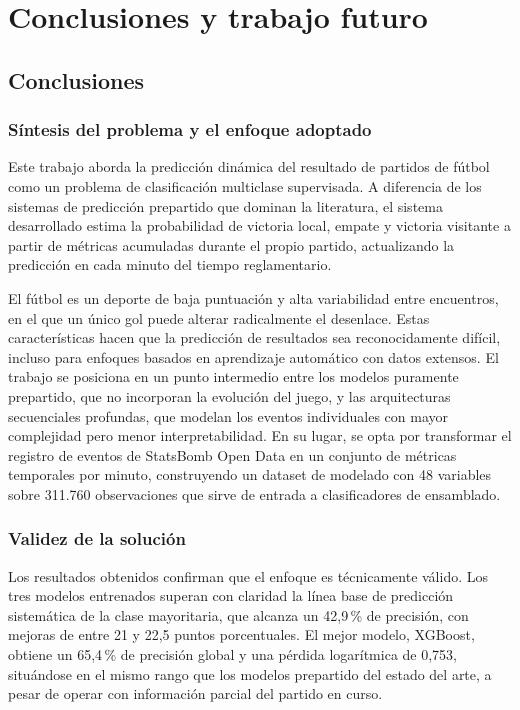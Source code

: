 \chapter{Conclusiones y trabajo futuro}

\section{Conclusiones}

\subsection{Síntesis del problema y el enfoque adoptado}

Este trabajo aborda la predicción dinámica del resultado de partidos de fútbol como un problema de clasificación multiclase supervisada. A diferencia de los sistemas de predicción prepartido que dominan la literatura, el sistema desarrollado estima la probabilidad de victoria local, empate y victoria visitante a partir de métricas acumuladas durante el propio partido, actualizando la predicción en cada minuto del tiempo reglamentario.

El fútbol es un deporte de baja puntuación y alta variabilidad entre encuentros, en el que un único gol puede alterar radicalmente el desenlace. Estas características hacen que la predicción de resultados sea reconocidamente difícil, incluso para enfoques basados en aprendizaje automático con datos extensos. El trabajo se posiciona en un punto intermedio entre los modelos puramente prepartido, que no incorporan la evolución del juego, y las arquitecturas secuenciales profundas, que modelan los eventos individuales con mayor complejidad pero menor interpretabilidad. En su lugar, se opta por transformar el registro de eventos de StatsBomb Open Data en un conjunto de métricas temporales por minuto, construyendo un dataset de modelado con 48 variables sobre 311.760 observaciones que sirve de entrada a clasificadores de ensamblado.

\subsection{Validez de la solución}

Los resultados obtenidos confirman que el enfoque es técnicamente válido. Los tres modelos entrenados superan con claridad la línea base de predicción sistemática de la clase mayoritaria, que alcanza un 42,9\,\% de precisión, con mejoras de entre 21 y 22,5 puntos porcentuales. El mejor modelo, XGBoost, obtiene un 65,4\,\% de precisión global y una pérdida logarítmica de 0,753, situándose en el mismo rango que los modelos prepartido del estado del arte, a pesar de operar con información parcial del partido en curso.

